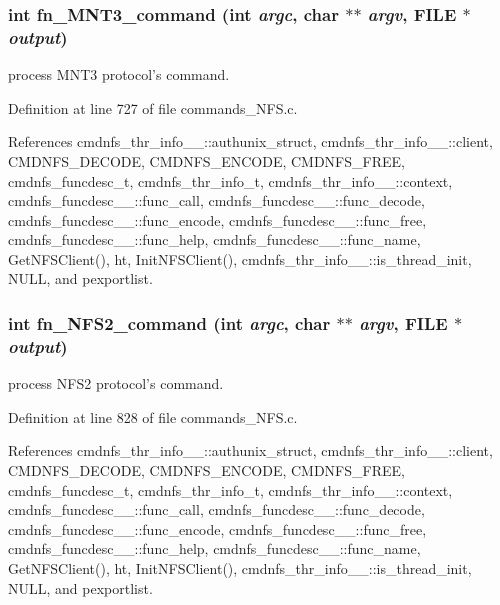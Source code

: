 \subsubsection{\setlength{\rightskip}{0pt plus 5cm}int fn\_\-MNT3\_\-command (int {\em argc}, char $\ast$$\ast$ {\em argv}, FILE $\ast$ {\em output})}\label{commands__NFS_8c_a24}


process MNT3 protocol's command. 

Definition at line 727 of file commands\_\-NFS.c.

References cmdnfs\_\-thr\_\-info\_\-\_\-::authunix\_\-struct, cmdnfs\_\-thr\_\-info\_\-\_\-::client, CMDNFS\_\-DECODE, CMDNFS\_\-ENCODE, CMDNFS\_\-FREE, cmdnfs\_\-funcdesc\_\-t, cmdnfs\_\-thr\_\-info\_\-t, cmdnfs\_\-thr\_\-info\_\-\_\-::context, cmdnfs\_\-funcdesc\_\-\_\-::func\_\-call, cmdnfs\_\-funcdesc\_\-\_\-::func\_\-decode, cmdnfs\_\-funcdesc\_\-\_\-::func\_\-encode, cmdnfs\_\-funcdesc\_\-\_\-::func\_\-free, cmdnfs\_\-funcdesc\_\-\_\-::func\_\-help, cmdnfs\_\-funcdesc\_\-\_\-::func\_\-name, Get\-NFSClient(), ht, Init\-NFSClient(), cmdnfs\_\-thr\_\-info\_\-\_\-::is\_\-thread\_\-init, NULL, and pexportlist.
\subsubsection{\setlength{\rightskip}{0pt plus 5cm}int fn\_\-NFS2\_\-command (int {\em argc}, char $\ast$$\ast$ {\em argv}, FILE $\ast$ {\em output})}\label{commands__NFS_8c_a25}


process NFS2 protocol's command. 

Definition at line 828 of file commands\_\-NFS.c.

References cmdnfs\_\-thr\_\-info\_\-\_\-::authunix\_\-struct, cmdnfs\_\-thr\_\-info\_\-\_\-::client, CMDNFS\_\-DECODE, CMDNFS\_\-ENCODE, CMDNFS\_\-FREE, cmdnfs\_\-funcdesc\_\-t, cmdnfs\_\-thr\_\-info\_\-t, cmdnfs\_\-thr\_\-info\_\-\_\-::context, cmdnfs\_\-funcdesc\_\-\_\-::func\_\-call, cmdnfs\_\-funcdesc\_\-\_\-::func\_\-decode, cmdnfs\_\-funcdesc\_\-\_\-::func\_\-encode, cmdnfs\_\-funcdesc\_\-\_\-::func\_\-free, cmdnfs\_\-funcdesc\_\-\_\-::func\_\-help, cmdnfs\_\-funcdesc\_\-\_\-::func\_\-name, Get\-NFSClient(), ht, Init\-NFSClient(), cmdnfs\_\-thr\_\-info\_\-\_\-::is\_\-thread\_\-init, NULL, and pexportlist.
